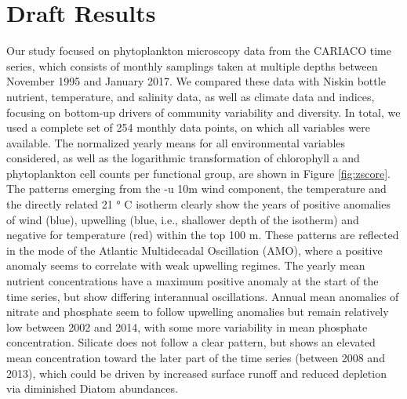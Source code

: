 \documentclass[draft]{agujournal2019}
\begin{document}
\section{Draft Results}
Our study focused on phytoplankton microscopy data from the CARIACO time series, which consists of monthly samplings taken at multiple depths between November 1995 and January 2017. We compared these data with Niskin bottle nutrient, temperature, and salinity data, as well as climate data and indices, focusing on bottom-up drivers of community variability and diversity. In total, we used a complete set of 254 monthly data points, on which all variables were available. 
The normalized yearly means for all environmental variables considered, as well as the logarithmic transformation of chlorophyll a and phytoplankton cell counts per functional group, are shown in Figure \ref{fig:zscore}. The patterns emerging from the -u 10m wind component, the temperature and the directly related 21 ° C isotherm clearly show the years of positive anomalies of wind (blue), upwelling (blue, i.e., shallower depth of the isotherm) and negative for temperature (red) within the top 100 m. These patterns are reflected in the mode of the Atlantic Multidecadal Oscillation (AMO), where a positive anomaly seems to correlate with weak upwelling regimes. The yearly mean nutrient concentrations have a maximum positive anomaly at the start of the time series, but show differing interannual oscillations. Annual mean anomalies of nitrate and phosphate seem to follow upwelling anomalies but remain relatively low between 2002 and 2014, with some more variability in mean phosphate concentration. Silicate does not follow a clear pattern, but shows an elevated mean concentration toward the later part of the time series (between 2008 and 2013), which could be driven by increased surface runoff \cite{lorenzoni_characterization_2015} and reduced depletion via diminished Diatom abundances. 
\end{document}
